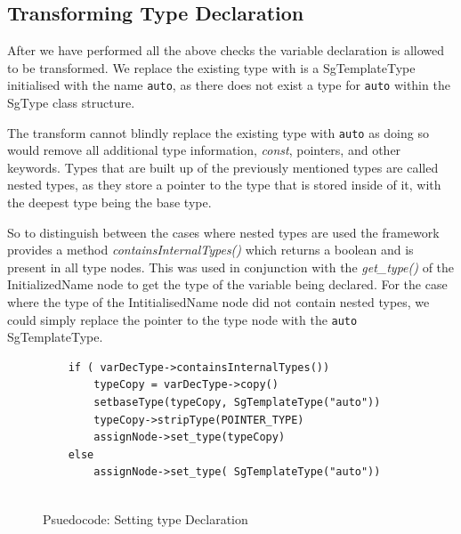 \documentclass[bsc,frontabs,singlespacing,parskip,deptreport]{infthesis}
\begin{document}

\subsection{Transforming Type Declaration}
After we have performed all the above checks the variable declaration is allowed to be transformed. We replace the existing type with is a SgTemplateType initialised with the name \texttt{auto}, as there does not exist a type for \texttt{auto} within the SgType class structure. 

The transform cannot blindly replace the existing type with \texttt{auto} as doing so would remove all additional type information, \textit{const}, pointers, and other keywords. Types that are built up of the previously mentioned types are called nested types, as they store a pointer to the type that is stored inside of it, with the deepest type being the base type.

So to distinguish between the cases where nested types are used the framework provides a method \textit{containsInternalTypes()} which returns a boolean and is present in all type nodes. This was used in conjunction with the \textit{get\_type()} of the InitializedName node to get the type of the variable being declared. For the case where the type of the IntitialisedName node did not contain nested types, we could simply replace the pointer to the type node with the \texttt{auto} SgTemplateType. 

\begin{figure}[H]
    \centering
    \begin{verbatim}
    if ( varDecType->containsInternalTypes())
        typeCopy = varDecType->copy()
        setbaseType(typeCopy, SgTemplateType("auto"))
        typeCopy->stripType(POINTER_TYPE)
        assignNode->set_type(typeCopy)
    else
        assignNode->set_type( SgTemplateType("auto"))
    
    \end{verbatim}
    \caption{Psuedocode: Setting type Declaration}
    \label{fig:auto-cases-nested-types}
\end{figure}
\end{document}
